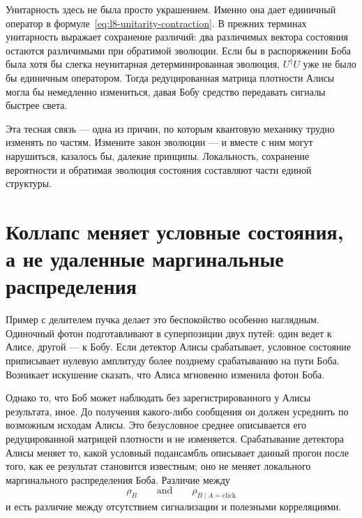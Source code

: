 Унитарность здесь не была просто украшением. Именно она дает единичный оператор в формуле~\eqref{eq:l8-unitarity-contraction}. В прежних терминах унитарность выражает сохранение различий: два различимых вектора состояния остаются различимыми при обратимой эволюции. Если бы в распоряжении Боба была хотя бы слегка неунитарная детерминированная эволюция, \(U^\dagger U\) уже не было бы единичным оператором. Тогда редуцированная матрица плотности Алисы могла бы немедленно измениться, давая Бобу средство передавать сигналы быстрее света.

Эта тесная связь — одна из причин, по которым квантовую механику трудно изменять по частям. Измените закон эволюции — и вместе с ним могут нарушиться, казалось бы, далекие принципы. Локальность, сохранение вероятности и обратимая эволюция состояния составляют части единой структуры.

\begin{classroomqa}
\end{classroomqa}

\section{Коллапс меняет условные состояния, а не удаленные маргинальные распределения}

Пример с делителем пучка делает это беспокойство особенно наглядным. Одиночный фотон подготавливают в суперпозиции двух путей: один ведет к Алисе, другой — к Бобу. Если детектор Алисы срабатывает, условное состояние приписывает нулевую амплитуду более позднему срабатыванию на пути Боба. Возникает искушение сказать, что Алиса мгновенно изменила фотон Боба.

Однако то, что Боб может наблюдать без зарегистрированного у Алисы результата, иное. До получения какого-либо сообщения он должен усреднить по возможным исходам Алисы. Это безусловное среднее описывается его редуцированной матрицей плотности и не изменяется. Срабатывание детектора Алисы меняет то, какой условный подансамбль описывает данный прогон после того, как ее результат становится известным; оно не меняет локального маргинального распределения Боба. Различие между
\begin{equation}
\rho_B
\qquad\text{and}\qquad
\rho_{B\mid A=\text{click}}
\end{equation}
и есть различие между отсутствием сигнализации и полезными корреляциями.

